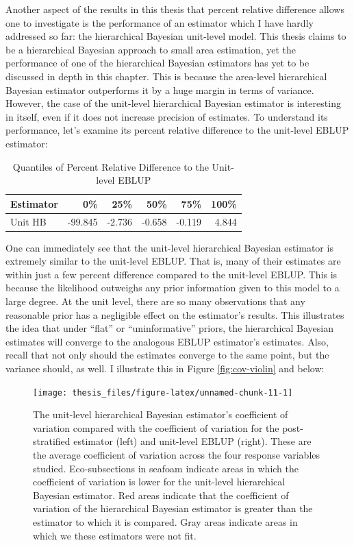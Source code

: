 \documentclass[12pt,twoside]{reedthesis}
\begin{document}
Another aspect of the results in this thesis that percent relative difference allows one to investigate is the performance of an estimator which I have hardly addressed so far: the hierarchical Bayesian unit-level model. This thesis claims to be a hierarchical Bayesian approach to small area estimation, yet the performance of one of the hierarchical Bayesian estimators has yet to be discussed in depth in this chapter. This is because the area-level hierarchical Bayesian estimator outperforms it by a huge margin in terms of variance. However, the case of the unit-level hierarchical Bayesian estimator is interesting in itself, even if it does not increase precision of estimates. To understand its performance, let's examine its percent relative difference to the unit-level EBLUP estimator:
\begin{longtable}[t]{lrrrrr}
\caption{\label{tab:prd-unit}Quantiles of Percent Relative Difference to the Unit-level EBLUP}\\
\toprule
Estimator & 0\% & 25\% & 50\% & 75\% & 100\%\\
\midrule
Unit HB & -99.845 & -2.736 & -0.658 & -0.119 & 4.844\\
\bottomrule
\end{longtable}
One can immediately see that the unit-level hierarchical Bayesian estimator is extremely similar to the unit-level EBLUP. That is, many of their estimates are within just a few percent difference compared to the unit-level EBLUP. This is because the likelihood outweighs any prior information given to this model to a large degree. At the unit level, there are so many observations that any reasonable prior has a negligible effect on the estimator's results. This illustrates the idea that under ``flat'' or ``uninformative'' priors, the hierarchical Bayesian estimates will converge to the analogous EBLUP estimator's estimates. Also, recall that not only should the estimates converge to the same point, but the variance should, as well. I illustrate this in Figure \ref{fig:cov-violin} and below:
\clearpage
\begin{figure}

{\centering \texttt{[image: thesis\_files/figure-latex/unnamed-chunk-11-1]} 

}

\caption[Unit-level coefficient of variation comparison across the Interior West]{The unit-level hierarchical Bayesian estimator's coefficient of variation compared with the coefficient of variation for the post-stratified estimator (left) and unit-level EBLUP (right). These are the average coefficient of variation across the four response variables studied. Eco-subsections in seafoam indicate areas in which the coefficient of variation is lower for the unit-level hierarchical Bayesian estimator. Red areas indicate that the coefficient of variation of the hierarchical Bayesian estimator is greater than the estimator to which it is compared. Gray areas indicate areas in which we these estimators were not fit.}\label{fig:unnamed-chunk-11}
\end{figure}
\end{document}
